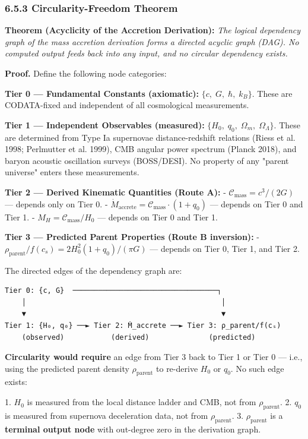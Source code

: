 \documentclass[11pt,a4paper]{article}
\theoremstyle{definition}
\theoremstyle{remark}
\begin{document}
\subsubsection{6.5.3 Circularity-Freedom Theorem}

\textbf{Theorem (Acyclicity of the Accretion Derivation):} \textit{The logical dependency graph of the mass accretion derivation forms a directed acyclic graph (DAG). No computed output feeds back into any input, and no circular dependency exists.}

\textbf{Proof.} Define the following node categories:

\textbf{Tier 0 — Fundamental Constants (axiomatic):} $\{c, \; G, \; \hbar, \; k_B\}$. These are CODATA-fixed and independent of all cosmological measurements.

\textbf{Tier 1 — Independent Observables (measured):} $\{H_0, \; q_0, \; \Omega_m, \; \Omega_\Lambda\}$. These are determined from Type Ia supernovae distance-redshift relations (Riess et al. 1998; Perlmutter et al. 1999), CMB angular power spectrum (Planck 2018), and baryon acoustic oscillation surveys (BOSS/DESI). No property of any "parent universe" enters these measurements.

\textbf{Tier 2 — Derived Kinematic Quantities (Route A):}
- $\mathcal{C}_{\text{mass}} = c^3 / (2G)$ — depends only on Tier 0.
- $\dot{M}_{\text{accrete}} = \mathcal{C}_{\text{mass}} \cdot (1 + q_0)$ — depends on Tier 0 and Tier 1.
- $M_H = \mathcal{C}_{\text{mass}} / H_0$ — depends on Tier 0 and Tier 1.

\textbf{Tier 3 — Predicted Parent Properties (Route B inversion):}
- $\rho_{\text{parent}} / f(c_s) = 2H_0^2 (1+q_0) / (\pi G)$ — depends on Tier 0, Tier 1, and Tier 2.

The directed edges of the dependency graph are:

\begin{verbatim}
Tier 0: {c, G}  ──────────────────────────────────┐
    │                                              │
    ▼                                              ▼
Tier 1: {H₀, q₀} ──► Tier 2: Ṁ_accrete ──► Tier 3: ρ_parent/f(cₛ)
    (observed)           (derived)              (predicted)
\end{verbatim}

\textbf{Circularity would require} an edge from Tier 3 back to Tier 1 or Tier 0 — i.e., using the predicted parent density $\rho_{\text{parent}}$ to re-derive $H_0$ or $q_0$. No such edge exists:

1. $H_0$ is measured from the local distance ladder and CMB, not from $\rho_{\text{parent}}$.
2. $q_0$ is measured from supernova deceleration data, not from $\rho_{\text{parent}}$.
3. $\rho_{\text{parent}}$ is a \textbf{terminal output node} with out-degree zero in the derivation graph.
\end{document}
